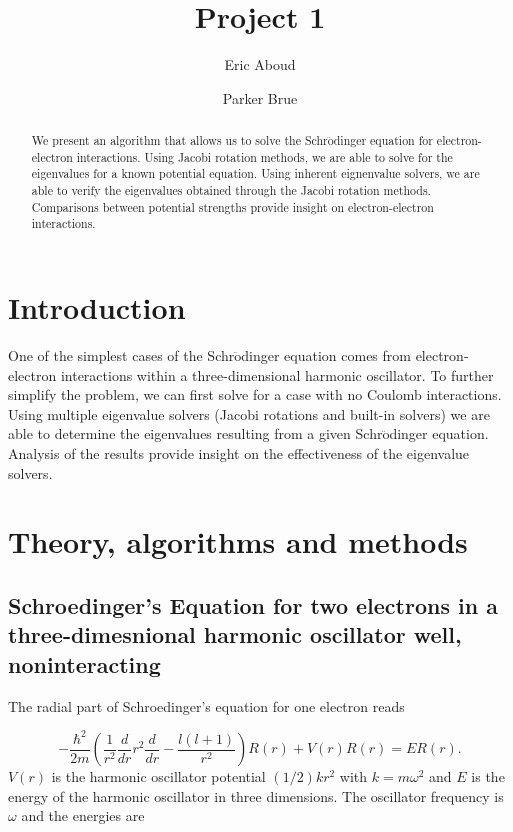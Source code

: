 \documentclass[%
reprint,
superscriptaddress,
showpacs,
nofootinbib,
bibnotes,amsmath,amssymb,aps,
prc, 
]{revtex4-1}
\begin{document}
	\title{Project 1}
	\author{Eric Aboud}
	\author{Parker Brue}
	\begin{abstract}
	We present an algorithm that allows us to solve the Schr$\ddot{\textrm{o}}$dinger equation for electron-electron interactions.  Using Jacobi rotation methods, we are able to solve for the eigenvalues for a known potential equation.  Using inherent eignenvalue solvers, we are able to verify the eigenvalues obtained through the Jacobi rotation methods.  Comparisons between potential strengths provide insight on electron-electron interactions.
	\end{abstract}
	\maketitle
	
	
	\section{Introduction}
	
	One of the simplest cases of the Schr$\ddot{\textrm{o}}$dinger equation comes from electron-electron interactions within a three-dimensional harmonic oscillator.  To further simplify the problem, we can first solve for a case with no Coulomb interactions.  Using multiple eigenvalue solvers (Jacobi rotations and built-in solvers) we are able to determine the eigenvalues resulting from a given Schr$\ddot{\textrm{o}}$dinger equation.  Analysis of the results provide insight on the effectiveness of the eigenvalue solvers.
	
	
	\section{Theory, algorithms and methods}
\subsection{Schroedinger's Equation for two electrons in a three-dimesnional harmonic oscillator well, noninteracting}	
The radial part of Schroedinger's equation for one electron reads

\begin{equation*}
	-\frac{\hbar^2}{2 m} \left ( \frac{1}{r^2} \frac{d}{dr} r^2
	\frac{d}{dr} - \frac{l (l + 1)}{r^2} \right )R(r) 
	+ V(r) R(r) = E R(r).
\end{equation*}
$V(r)$ is the harmonic oscillator potential $(1/2)kr^2$ with
$k=m\omega^2$ and $E$ is
the energy of the harmonic oscillator in three dimensions.
The oscillator frequency is $\omega$ and the energies are
\end{document}
